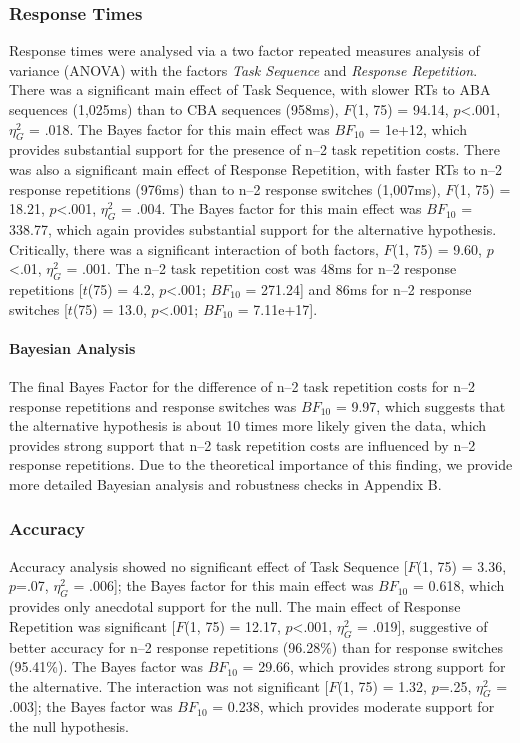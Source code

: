 \documentclass[a4paper, doc, natbib]{apa6}
\begin{document}
\subsubsection{Response Times} 
Response times were analysed via a two factor repeated measures analysis of variance (ANOVA) with the factors \emph{Task Sequence} and \emph{Response Repetition}. There was a significant main effect of Task Sequence, with slower RTs to ABA sequences (1,025ms) than to CBA sequences (958ms), $F$(1, 75) = 94.14, $p$<.001, $\eta_G^2$ = .018. The Bayes factor for this main effect was $BF_{10}$ = 1e+12, which provides substantial support for the presence of n--2 task repetition costs. There was also a significant main effect of Response Repetition, with faster RTs to n--2 response repetitions (976ms) than to n--2 response switches (1,007ms), $F$(1, 75) = 18.21, $p$<.001, $\eta_G^2$ = .004. The Bayes factor for this main effect was $BF_{10}$ = 338.77, which again provides substantial support for the alternative hypothesis. Critically, there was a significant interaction of both factors, $F$(1, 75) = 9.60, $p$<.01, $\eta_G^2$ = .001. The n--2 task repetition cost was 48ms for n--2 response repetitions [$t$(75) = 4.2, $p$<.001; $BF_{10}$ = 271.24] and 86ms for n--2 response switches [$t$(75) = 13.0, $p$<.001; $BF_{10}$ = 7.11e+17]. 

\paragraph{Bayesian Analysis}

The final Bayes Factor for the difference of n--2 task repetition costs for n--2 response repetitions and response switches was $BF_{10}$ = 9.97, which suggests that the alternative hypothesis is about 10 times more likely given the data, which provides strong support that n--2 task repetition costs are influenced by n--2 response repetitions. Due to the theoretical importance of this finding, we provide more detailed Bayesian analysis and robustness checks in Appendix B.

\subsubsection{Accuracy}
Accuracy analysis showed no significant effect of Task Sequence [$F$(1, 75) = 3.36, $p$=.07, $\eta_G^2$ = .006]; the Bayes factor for this main effect was $BF_{10}$ = 0.618, which provides only anecdotal support for the null. The main effect of Response Repetition was significant [$F$(1, 75) = 12.17, $p$<.001, $\eta_G^2$ = .019], suggestive of better accuracy for n--2 response repetitions (96.28\%) than for response switches (95.41\%). The Bayes factor was $BF_{10}$ = 29.66, which provides strong support for the alternative. The interaction was not significant [$F$(1, 75) = 1.32, $p$=.25, $\eta_G^2$ = .003]; the Bayes factor was $BF_{10}$ = 0.238, which provides moderate support for the null hypothesis.
\end{document}
